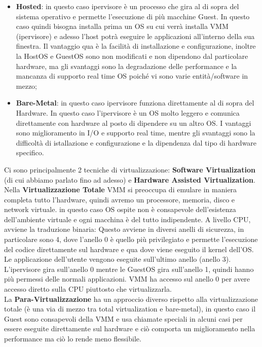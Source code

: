 \documentclass[11pt, twocolumn]{article}
\newenvironment{myitemize}
{ \begin{itemize}[topsep=0ex]
		\setlength{\itemsep}{0pt}
		\setlength{\parskip}{0pt}
		\setlength{\parsep}{0pt}     }
	{ \end{itemize}                  }
\begin{document}
\begin{myitemize}
	\item \textbf{Hosted}: in questo caso ipervisore è un processo che gira al di sopra del sistema operativo e permette l'esecuzione di più macchine Guest.
	In questo caso quindi bisogna installa prima un OS su cui verrà installa VMM (ipervisore) e adesso l'host potrà eseguire le applicazioni all'interno della sua finestra.
	Il vantaggio qua è la facilità di installazione e configurazione, inoltre la HostOS e GuestOS sono non modificati e non dipendono dal particolare hardware, ma gli svantaggi sono la degradazione delle performance e la mancanza di supporto real time OS poiché vi sono varie entità/software in mezzo;
	\item \textbf{Bare-Metal}: in questo caso ipervisore funziona direttamente al di sopra del Hardware.
	In questo caso l'ipervisore è un OS molto leggero e comunica direttamente con hardware al posto di dipendere su un altro OS. 
	I vantaggi sono miglioramento in I/O e supporto real time, mentre gli svantaggi sono la difficoltà di istallazione e configurazione e la dipendenza dal tipo di hardware specifico.
\end{myitemize}
Ci sono principalmente 2 tecniche di virtualizzazione: \textbf{Software Virtualization} (di cui abbiamo parlato fino ad adesso) e \textbf{Hardware Assisted Virtualization}.\\
Nella \textbf{Virtualizzazione Totale} VMM si preoccupa di emulare in maniera completa tutto l'hardware, quindi avremo un processore, memoria, disco e network virtuale.
in questo caso OS ospite non è consapevole dell'esistenza dell'ambiente virtuale e ogni macchina è del tutto indipendente.
A livello CPU, avviene la traduzione binaria: Questo avviene in diversi anelli di sicurezza, in particolare sono 4, dove l'anello 0 è quello più privilegiato e permette l'esecuzione del codice direttamente sul hardware e qua dove viene eseguito il kernel dell'OS.
Le applicazione dell'utente vengono eseguite sull'ultimo anello (anello 3).\\
L'ipervisore gira sull'anello 0 mentre le GuestOS gira sull'anello 1, quindi hanno più permessi delle normali applicazioni. 
VMM ha accesso sul anello 0 per avere accesso diretto sulla CPU piuttosto che virtualizzarla. \\
La \textbf{Para-Virtualizzazione} ha un approccio diverso rispetto alla virtualizzazione totale (è una via di mezzo tra total virtualization e bare-metal), in questo caso il Guest sono consapevoli della VMM e usa chiamate speciali in alcuni casi per essere eseguite direttamente sul hardware e ciò comporta un miglioramento nella performance ma ciò lo rende meno flessibile.\\
\end{document}
